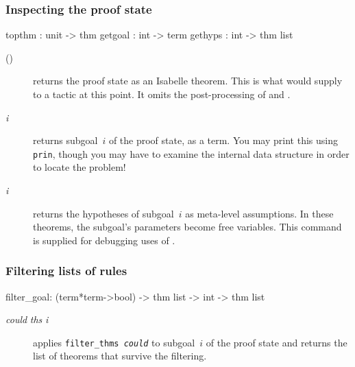 \subsubsection{Inspecting the proof state}
\begin{ttbox} 
topthm  : unit -> thm
getgoal : int -> term
gethyps : int -> thm list
\end{ttbox}

\begin{description}
\item[()]  
returns the proof state as an Isabelle theorem.  This is what 
would supply to a tactic at this point.  It omits the post-processing of
 and .

\item[ {\it i}]  
returns subgoal~$i$ of the proof state, as a term.  You may print
this using {\tt prin}, though you may have to examine the internal
data structure in order to locate the problem!

\item[ {\it i}]  
returns the hypotheses of subgoal~$i$ as meta-level assumptions.  In these
theorems, the subgoal's parameters become free variables.  This command is
supplied for debugging uses of .
\end{description}

\subsubsection{Filtering lists of rules}
\begin{ttbox} 
filter_goal: (term*term->bool) -> thm list -> int -> thm list
\end{ttbox}

\begin{description}
\item[ {\it could} {\it ths} {\it i}] 
applies \hbox{\tt filter_thms {\it could}} to subgoal~$i$ of the proof
state and returns the list of theorems that survive the filtering. 
\end{description}

